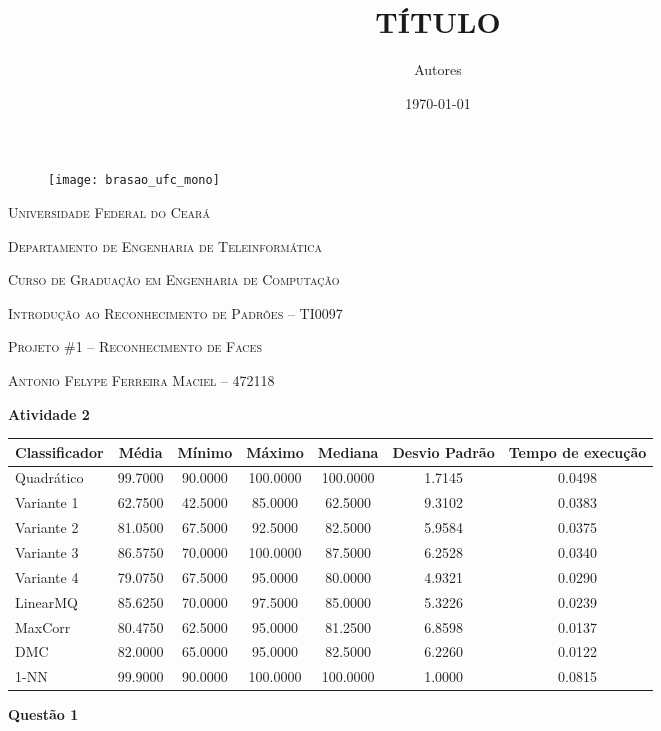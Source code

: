 \documentclass[12pt]{article}
\title{\Large \textbf{TÍTULO}}
\author{Autores}
\date{\today}
\begin{document}
	\begin{wrapfigure}{l}{1.5cm}
		\texttt{[image: brasao\_ufc\_mono]}
	\end{wrapfigure}

	\textsc{Universidade Federal do Ceará}
			
	\textsc{Departamento de Engenharia de Teleinformática}
			
	\textsc{Curso de Graduação em Engenharia de Computação}
			
	\textsc{Introdução ao Reconhecimento de Padrões -- TI0097}
	
	\hfill
	
	\Large{\textsc{Projeto \#1 -- Reconhecimento de Faces}}
	
	\normalsize
	
	\textsc{Antonio Felype Ferreira Maciel -- 472118}
	
	
	\hfill
		
	\textbf{Atividade 2}
	
	\hfill
	
	\begin{tabular}{lcccccc}
		\hline
		Classificador & Média & Mínimo & Máximo & Mediana & Desvio Padrão & Tempo de execução \\
		\hline
		Quadrático &  99.7000 &  90.0000 & 100.0000 & 100.0000 &   1.7145 &   0.0498 \\
		Variante 1 &  62.7500 &  42.5000 &  85.0000 &  62.5000 &   9.3102 &   0.0383 \\
		Variante 2 &  81.0500 &  67.5000 &  92.5000 &  82.5000 &   5.9584 &   0.0375 \\
		Variante 3 &  86.5750 &  70.0000 & 100.0000 &  87.5000 &   6.2528 &   0.0340 \\
		Variante 4 &  79.0750 &  67.5000 &  95.0000 &  80.0000 &   4.9321 &   0.0290 \\
		LinearMQ   &  85.6250 &  70.0000 &  97.5000 &  85.0000 &   5.3226 &   0.0239 \\
		MaxCorr    &  80.4750 &  62.5000 &  95.0000 &  81.2500 &   6.8598 &   0.0137 \\
		DMC        &  82.0000 &  65.0000 &  95.0000 &  82.5000 &   6.2260 &   0.0122 \\
		1-NN       &  99.9000 &  90.0000 & 100.0000 & 100.0000 &   1.0000 &   0.0815 \\
		\hline
	\end{tabular}
	
	\hfill
	
	\textbf{Questão 1}
	
\end{document}
